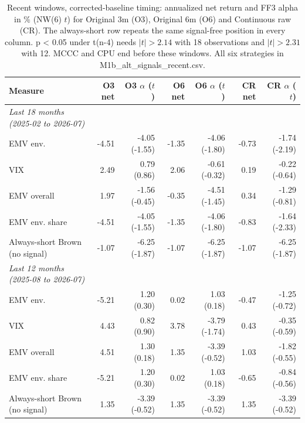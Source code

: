 \begin{table}[htbp]
\centering
\footnotesize
\caption{Recent windows, corrected-baseline timing: annualized net return and FF3 alpha in \% (NW(6) $t$) for Original 3m (O3), Original 6m (O6) and Continuous raw (CR). The always-short row repeats the same signal-free position in every column. p < 0.05 under t(n-4) needs $|t| > 2.14$ with 18 observations and $|t| > 2.31$ with 12. MCCC and CPU end before these windows. All six strategies in M1b\_alt\_signals\_recent.csv.}
\label{tab:m1b_recent}
\begin{tabular}{lrrrrrr}
\toprule
Measure & O3 net & O3 $\alpha$ ($t$) & O6 net & O6 $\alpha$ ($t$) & CR net & CR $\alpha$ ($t$) \\
\midrule
\textit{Last 18 months (2025-02 to 2026-07)} &  &  &  &  &  &  \\
EMV env. & -4.51 & -4.05 (-1.55) & -1.35 & -4.06 (-1.80) & -0.73 & -1.74 (-2.19) \\
VIX & 2.49 & 0.79 (0.86) & 2.06 & -0.61 (-0.32) & 0.19 & -0.22 (-0.64) \\
EMV overall & 1.97 & -1.56 (-0.45) & -0.35 & -4.51 (-1.45) & 0.34 & -1.29 (-0.81) \\
EMV env. share & -4.51 & -4.05 (-1.55) & -1.35 & -4.06 (-1.80) & -0.83 & -1.64 (-2.33) \\
Always-short Brown (no signal) & -1.07 & -6.25 (-1.87) & -1.07 & -6.25 (-1.87) & -1.07 & -6.25 (-1.87) \\
\textit{Last 12 months (2025-08 to 2026-07)} &  &  &  &  &  &  \\
EMV env. & -5.21 & 1.20 (0.30) & 0.02 & 1.03 (0.18) & -0.47 & -1.25 (-0.72) \\
VIX & 4.43 & 0.82 (0.90) & 3.78 & -3.79 (-1.74) & 0.43 & -0.35 (-0.59) \\
EMV overall & 4.51 & 1.30 (0.18) & 1.35 & -3.39 (-0.52) & 1.03 & -1.82 (-0.55) \\
EMV env. share & -5.21 & 1.20 (0.30) & 0.02 & 1.03 (0.18) & -0.65 & -0.84 (-0.56) \\
Always-short Brown (no signal) & 1.35 & -3.39 (-0.52) & 1.35 & -3.39 (-0.52) & 1.35 & -3.39 (-0.52) \\
\bottomrule
\end{tabular}
\end{table}
